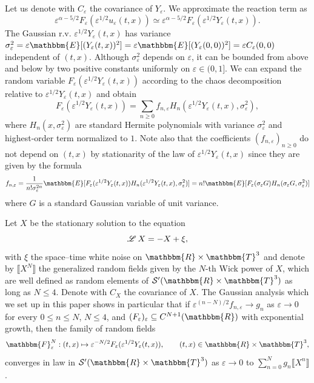 Let us denote with $C_{\varepsilon}$ the covariance of $Y_{\varepsilon}$. We
approximate the reaction term as
\[ \varepsilon^{\alpha - 5 / 2} F_{\varepsilon} (\varepsilon^{1 / 2}
   u_{\varepsilon} (t, x)) \simeq \varepsilon^{\alpha - 5 / 2} F_{\varepsilon}
   (\varepsilon^{1 / 2} Y_{\varepsilon} (t, x)) . \]
The Gaussian r.v. $\varepsilon^{1 / 2} Y_{\varepsilon} (t, x)$ has variance
$\sigma_{\varepsilon}^2 = \varepsilon \mathbbm{E} [ (Y_{\varepsilon} (t,
x))^2] = \varepsilon \mathbbm{E} [ (Y_{\varepsilon} (0, 0))^2] = \varepsilon
C_{\varepsilon} (0, 0)$ independent of $(t, x)$. Although
$\sigma_{\varepsilon}^2$ depends on $\varepsilon$, it can be bounded from
above and below by two positive constants uniformly on $\varepsilon \in (0,
1]$. We can expand the random variable $F_{\varepsilon} (\varepsilon^{1 / 2}
Y_{\varepsilon} (t, x))$ according to the chaos decomposition relative to
$\varepsilon^{1 / 2} Y_{\varepsilon} (t, x)$ and obtain
\begin{equation}
  F_{\varepsilon} (\varepsilon^{1 / 2} Y_{\varepsilon} (t, x)) = \sum_{n
  \geqslant 0} f_{n, \varepsilon} H_n (\varepsilon^{1 / 2} Y_{\varepsilon} (t,
  x), \sigma_{\varepsilon}^2), \label{e:F-chaos-exp}
\end{equation}
where $H_n (x, \sigma_{\varepsilon}^2)$ are standard Hermite polynomials with
variance $\sigma_{\varepsilon}^2$ and highest-order term normalized to $1$.
Note also that the coefficients $(f_{n, \varepsilon})_{n \geqslant 0}$ do not
depend on $(t, x)$ by stationarity of the law of $\varepsilon^{1 / 2}
Y_{\varepsilon} (t, x)$ since they are given by the formula
\[ f_{n, \varepsilon} = \frac{1}{n! \sigma^{2 n}_{\varepsilon}} \mathbbm{E}
   [F_{\varepsilon} (\varepsilon^{1 / 2} Y_{\varepsilon} (t, x)) H_n
   (\varepsilon^{1 / 2} Y_{\varepsilon} (t, x), \sigma_{\varepsilon}^2)] =
   n!\mathbbm{E} [F_{\varepsilon} (\sigma_{\varepsilon} G) H_n
   (\sigma_{\varepsilon} G, \sigma_{\varepsilon}^2)] \]
where $G$ is a standard Gaussian variable of unit variance.

Let $X$ be the stationary solution to the equation
\[ \mathscr{L} \hspace{.2em} X = - X + \xi, \]
with $\xi$ the space--time white noise on $\mathbbm{R} \times \mathbbm{T}^3$
and denote by $\llbracket X^N \rrbracket$ the generalized random fields given
by the $N$-th Wick power of $X$, which are well defined as random elements of
$\mathcal{S}' (\mathbbm{R} \times \mathbbm{T}^3)$ as long as $N \leqslant 4$.
Denote with $C_X$ the covariance of $X$. The Gaussian analysis which we set up
in this paper shows in particular that if $\varepsilon^{(n - N) / 2} f_{n,
\varepsilon} \rightarrow g_n$ as $\varepsilon \rightarrow 0$ for every $0
\leqslant n \leqslant N$, $N \leqslant 4$, and
$(F_{\varepsilon})_{\varepsilon} \subseteq C^{N + 1} (\mathbbm{R})$ with
exponential growth, then the family of random fields
\[ \mathbbm{F}^N_{\varepsilon} : (t, x) \mapsto \varepsilon^{- N / 2}
   F_{\varepsilon} (\varepsilon^{1 / 2} Y_{\varepsilon} (t, x)), \qquad (t, x)
   \in \mathbbm{R} \times \mathbbm{T}^3, \]
converges in law in $\mathcal{S}' (\mathbbm{R} \times \mathbbm{T}^3)$ as
$\varepsilon \rightarrow 0$ to $\sum_{n = 0}^N g_n \llbracket X^n \rrbracket$.

